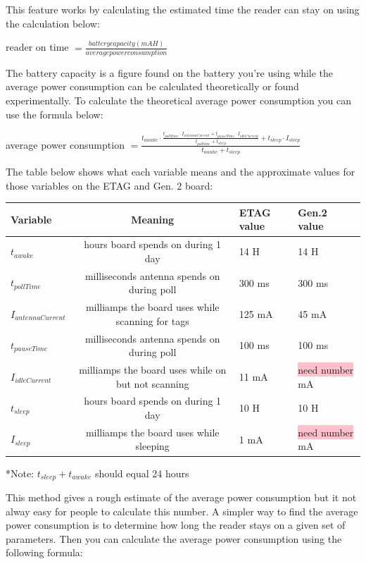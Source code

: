 \documentclass[12pt]{article}
\begin{document}
This feature works by calculating the estimated time the reader can stay on using the calculation below:
\begin{center}
	reader on time $= \frac{battery capacity (mAH)}{average power consumption} $
\end{center}
The battery capacity is a figure found on the battery you're using while the average power consumption can be calculated theoretically or found experimentally.  To calculate the theoretical average power consumption you can use the formula below:
\begin{center}
	average power consumption $= \frac{t_{awake} \cdot \frac{t_{pollTime} \cdot I_{antennaCurrent} + t_{pauseTime} \cdot I_{idleCurrent}}{t_{poll time} + t_{sleep}} + t_{sleep} \cdot I_{sleep}}{t_{awake} + t_{sleep}}  $
\end{center}
The table below shows what each variable means and the approximate values for those variables on the ETAG and Gen. 2 board:
\begin{center}
	\begin{tabularx}{\textwidth}{ |X|c|X|X| }
		\hline
		\textbf{Variable} & \textbf{Meaning} & \textbf{ETAG value} & \textbf{Gen.2 value} \\ 
		\hline
		$t_{awake}$ & hours board spends on during 1 day & 14 H & 14 H \\ 
		\hline
		$t_{pollTime}$ & milliseconds antenna spends on during poll & 300 ms & 300 ms \\ 
		\hline
		$I_{antennaCurrent}$ & milliamps the board uses while scanning for tags & 125 mA & 45 mA \\ 
		\hline
		$t_{pauseTime}$ & milliseconds antenna spends on during poll & 100 ms & 100 ms \\ 
		\hline
		$I_{idleCurrent}$ & milliamps the board uses while on but not scanning  & 11 mA & \colorbox{pink}{need number} mA \\ 
		\hline
		$t_{sleep}$ & hours board spends on during 1 day & 10 H & 10 H \\ 
		\hline
		$I_{sleep}$ & milliamps the board uses while sleeping  & 1 mA & \colorbox{pink}{need number} mA \\ 
		\hline
	\end{tabularx}
	*Note: $t_{sleep} + t_{awake}$ should equal 24 hours
\end{center}
This method gives a rough estimate of the average power consumption but it not alway easy for people to calculate this number.  A simpler way to find the average power consumption is to determine how long the reader stays on a given set of parameters.  Then you can calculate the average power consumption using the following formula:
\end{document}
